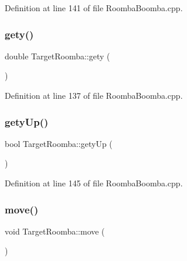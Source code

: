 Definition at line 141 of file Roomba\+Boomba.\+cpp.

\mbox{\label{classTargetRoomba_afed863951ef4cee3f44f74c899c3ab6f}} 
\subsubsection{\texorpdfstring{gety()}{gety()}}
{\footnotesize\ttfamily double Target\+Roomba\+::gety (\begin{DoxyParamCaption}{ }\end{DoxyParamCaption})\hspace{0.3cm}{\ttfamily [inline]}}



Definition at line 137 of file Roomba\+Boomba.\+cpp.

\mbox{\label{classTargetRoomba_ad1df35c81a5fe700facdca476a290ee6}} 
\subsubsection{\texorpdfstring{getyUp()}{getyUp()}}
{\footnotesize\ttfamily bool Target\+Roomba\+::gety\+Up (\begin{DoxyParamCaption}{ }\end{DoxyParamCaption})\hspace{0.3cm}{\ttfamily [inline]}}



Definition at line 145 of file Roomba\+Boomba.\+cpp.

\mbox{\label{classTargetRoomba_aa9d23db054d10261907f626f5f915913}} 
\subsubsection{\texorpdfstring{move()}{move()}}
{\footnotesize\ttfamily void Target\+Roomba\+::move (\begin{DoxyParamCaption}{ }\end{DoxyParamCaption})\hspace{0.3cm}{\ttfamily [inline]}}




